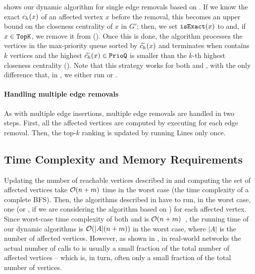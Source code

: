 shows our dynamic algorithm for single edge
removals based on \nbcut.
If we know the exact $c_h(x)$ of an affected vertex $x$ before
the removal, this becomes an upper bound on the closeness centrality of $x$ in
$G'$; then, we set $\texttt{isExact}(x)$ to \false and, if $x\in\texttt{TopK}$, we remove it
from \topk ().
%
Once this is done, the algorithm processes the vertices in the max-priority
queue \prioq sorted by $\widetilde{c_h}(x)$ and terminates when \topk contains $k$
vertices and the highest $\widetilde{c_h}(x) \in \texttt{PrioQ}$ is smaller than the $k$-th
highest closeness centrality ().
Note that this strategy works for both \nbcut and \nbbound, with the only difference
that, in , we either run \bfscut or \bfsbound.



\paragraph{Handling multiple edge removals}
%
As with multiple edge insertions, multiple edge removals are handled in two
steps. First, all the affected vertices are computed by executing
 for each edge
removal. Then, the top-$k$ ranking is updated by running Lines
 only once.


\subsection{Time Complexity and Memory Requirements}
%
Updating the number of reachable vertices described in
 and computing the set of affected vertices
take $\mathcal{O}(n + m)$ time in the worst case (the time complexity of a complete
BFS). Then, the algorithms described in
have to run, in the worst case, one \bfscut (or
\bfsbound, if we are considering the algorithm based on \bfsbound) for each
affected vertex. Since worst-case time complexity of both \bfscut and \bfsbound
is $\mathcal{O}(n + m)$~\cite{DBLP:journals/tkdd/BergaminiBCMM19}, the running time of
our dynamic algorithms is $\mathcal{O}(|A|(n + m))$ in the worst case, where $|A|$ is
the number of affected vertices. However, as shown in
, in real-world networks the actual
number of calls to \bfscut is usually a small fraction of the total number of
affected vertices -- which is, in turn, often only a small fraction of the total
number of vertices.

